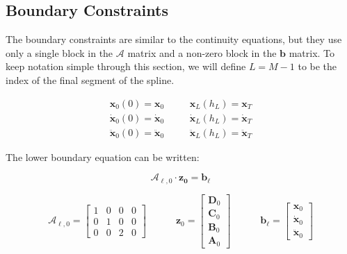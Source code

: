 \subsection{Boundary Constraints}

The boundary constraints are similar to the continuity equations,
but they use only a single block in the $\mathcal{A}$ matrix and a non-zero block in the $\bm{b}$ matrix.
To keep notation simple through this section,
we will define $L = M-1$ to be the index of the final segment of the spline.

\begin{align}
  \bm{x}_0(0) = \bm{x}_0  & \quad &  \bm{x}_L(h_L) = \bm{x}_T \\
  \dot{\bm{x}}_0(0) = \dot{\bm{x}}_0  & \quad & \dot{\bm{x}}_L(h_L) = \dot{\bm{x}}_T \\
  \ddot{\bm{x}}_0(0) = \ddot{\bm{x}}_0  & \quad & \ddot{\bm{x}}_L(h_L) = \ddot{\bm{x}}_T
\end{align}

The lower boundary equation can be written:

\begin{equation}
\mathcal{A}_{\ell, 0}
\cdot
\bm{z_0}
=
\bm{b}_\ell
\label{eqn:lowerBoundaryConstraintSymbols}
\end{equation}


\begin{equation}

\mathcal{A}_{\ell, 0}
=
\begin{bmatrix}
  1 & 0 & 0  & 0 \\
  0 & 1   & 0  & 0 \\
  0 & 0   & 2      & 0
\end{bmatrix}

\quad \quad \quad

\bm{z}_0
=
\begin{bmatrix}
  \bm{D}_0 \\
  \bm{C}_0 \\
  \bm{B}_0 \\
  \bm{A}_0
\end{bmatrix}

\quad \quad \quad

\bm{b}_\ell
=
\begin{bmatrix}
  \bm{x}_0 \\
  \dot{\bm{x}}_0 \\
  \ddot{\bm{x}}_0
\end{bmatrix}

\label{eqn:lowerBoundaryConstraint}
\end{equation}


